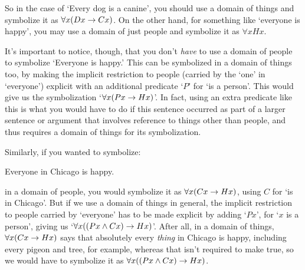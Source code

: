So in the case of  `Every dog is a canine', you should use a domain of things and symbolize it as $\forall x(Dx \rightarrow Cx)$.  On the other hand, for something like `everyone is happy', you may use a domain of just people and symbolize it as $\forall xHx$. %

It's important to notice, though, that you don't \emph{have} to use a domain of people to symbolize `Everyone is happy.' This can be symbolized in a domain of things too, by making the implicit restriction to people (carried by the `one' in `everyone') explicit with an additional predicate `$P$' for `\blank is a person'. This would give us the symbolization `$\forall x(Px \rightarrow Hx)$'.  In fact, using an extra predicate like this is what you would have to do if this sentence occurred as part of a larger sentence or argument that involves reference to things other than people, and thus requires a domain of things for its symbolization.   

Similarly, if you wanted to symbolize:
\begin{earg}
	\item[\ex{quan5}] Everyone in Chicago is happy.
\end{earg}
in a domain of people, you would symbolize it as $\forall x(Cx \rightarrow Hx)$, using $C$ for `\blank is in Chicago'.  But if we use a domain of things in general, the implicit restriction to people carried by `everyone' has to be made explicit by adding `$Px$', for `$x$ is a person', giving us  `$\forall x((Px \wedge Cx) \rightarrow Hx)$'.  After all, in a domain of things, $\forall x(Cx \rightarrow Hx)$ says that absolutely every \emph{thing} in Chicago is happy, including every pigeon and tree, for example, whereas that isn't required to make  true, so we would have to symbolize it as $\forall x((Px \wedge Cx) \rightarrow Hx)$.

